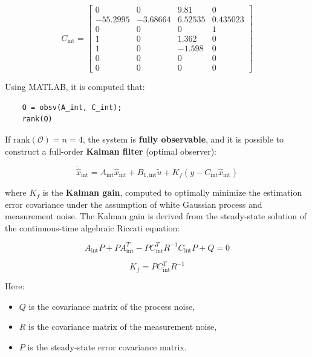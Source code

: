 \documentclass[]{report}
\begin{document}
\begin{equation}
	C_{\text{int}} =
	\begin{bmatrix}
		0 & 0 & 9.81 & 0 \\
		-55.2995 & -3.68664 & 6.52535 & 0.435023 \\
		0 & 0 & 0 & 1 \\
		1 & 0 & 1.362 & 0  \\
		1 & 0 & -1.598 & 0 \\
		0 & 0 & 0 & 0 \\
		0 & 0 & 0 & 0 
	\end{bmatrix}
\end{equation}

Using MATLAB, it is computed that:

\begin{verbatim}
	O = obsv(A_int, C_int);
	rank(O)
\end{verbatim}

If $\text{rank}(\mathcal{O}) = n = 4$, the system is \textbf{fully observable}, and it is possible to construct a full-order \textbf{Kalman filter} (optimal observer):

\begin{equation}
	\dot{\hat{x}}_{\text{int}} = A_{\text{int}} \hat{x}_{\text{int}} + B_{1,\text{int}} \tilde{u} + K_f(y - C_{\text{int}} \hat{x}_{\text{int}})
\end{equation}

where $K_f$ is the \textbf{Kalman gain}, computed to optimally minimize the estimation error covariance under the assumption of white Gaussian process and measurement noise. The Kalman gain is derived from the steady-state solution of the continuous-time algebraic Riccati equation:

\begin{equation}
	A_{\text{int}} P + P A_{\text{int}}^T - P C_{\text{int}}^T R^{-1} C_{\text{int}} P + Q = 0
\end{equation}

\begin{equation}
	K_f = P C_{\text{int}}^T R^{-1}
\end{equation}

Here:
\begin{itemize}
	\item $Q$ is the covariance matrix of the process noise,
	\item $R$ is the covariance matrix of the measurement noise,
	\item $P$ is the steady-state error covariance matrix.
\end{itemize}
\end{document}
